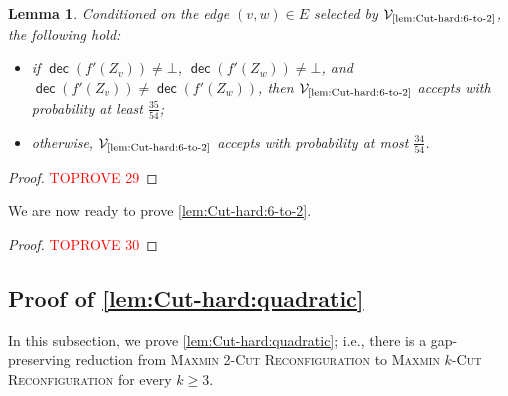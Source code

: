 \documentclass[11pt,fleqn]{article}
\renewcommand{\geq}{\geqslant}
\newcommand{\prb}[1]{\textsc{#1}\xspace}
\DeclareMathOperator{\dec}{\mathsf{dec}}
\newcommand{\V}{\calV}
\newcommand{\f}{f}
\newcommand{\Vsix}{\V_{\text{\ref{lem:Cut-hard:6-to-2}}}}
\newcommand{\MMkCutReconf}{\prb{Maxmin $k$-Cut Reconfiguration}}
\newcommand{\MMtwoCutReconf}{\prb{Maxmin 2-Cut Reconfiguration}}
\newcommand{\calV}{\mathcal{V}}
\newtheorem{lemma}[theorem]{Lemma}
\theoremstyle{definition}
\numberwithin{equation}{section}
\begin{document}
\begin{lemma}
\label{lem:Cut-hard:6-to-2:verifier}
    Conditioned on the edge $(v,w) \in E$ selected by $\Vsix$,
    the following hold\textup{:}
    \begin{itemize}
        \item if
        $\dec(\f'(Z_v)) \neq \bot$,
        $\dec(\f'(Z_w)) \neq \bot$, and
        $\dec(\f'(Z_v)) \neq \dec(\f'(Z_w))$,
        then $\Vsix$ accepts with probability at least $\frac{35}{54}$\textup{;}
        \item otherwise, 
        $\Vsix$ accepts with probability at most $\frac{34}{54}$.
    \end{itemize}
\end{lemma}
\begin{proof}\textcolor{red}{TOPROVE 29}\end{proof}



We are now ready to prove \cref{lem:Cut-hard:6-to-2}.
\begin{proof}\textcolor{red}{TOPROVE 30}\end{proof}











\subsection{Proof of \texorpdfstring{\cref{lem:Cut-hard:quadratic}}{Lemma~\protect\ref{lem:Cut-hard:quadratic}}}
\label{app:Cut-hard:quadratic}

In this subsection, we prove \cref{lem:Cut-hard:quadratic}; i.e.,
there is a gap-preserving reduction from
\MMtwoCutReconf to \MMkCutReconf for every $k \geq 3$.
\end{document}

